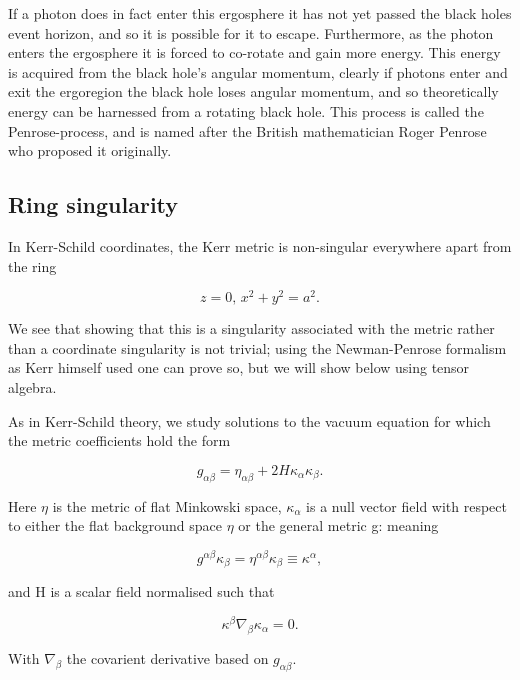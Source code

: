 \documentclass[oneside,openright,frontopenright, singlespacing]{dmathesis}
\begin{document}
\vspace{1em}
	If a photon does in fact enter this ergosphere it has not yet passed the black holes event horizon, and so it is possible for it to escape. Furthermore, as the photon enters the ergosphere it is forced to co-rotate and gain more energy. This energy is acquired from the black hole's angular momentum, clearly if photons enter and exit the ergoregion the black hole loses angular momentum, and so theoretically energy can be harnessed from a rotating black hole. This process is called the Penrose-process\cite{penrose1971extraction}, and is named after the British mathematician Roger Penrose who proposed it originally.

\subsection{Ring singularity}\label{subsec:SubSection4.3.3}

\vspace{1em}
	In Kerr-Schild coordinates, the Kerr metric is non-singular everywhere apart from the ring

	\[z=0\mbox{, } x^2+y^2=a^2.\]

\vspace{1em}
	We see that showing that this is a singularity associated with the metric rather than a coordinate singularity is not trivial; using the Newman-Penrose formalism as Kerr himself used\cite{kerr2008discovering} one can prove so, but we will show below using tensor algebra. 

\vspace{1em}
	As in Kerr-Schild theory, we study solutions to the vacuum equation for which the metric coefficients hold the form

	\[g_{\alpha\beta} = \eta_{\alpha\beta} + 2H\kappa_\alpha\kappa_\beta.\]

\vspace{1em}
	Here $\eta$ is the metric of flat Minkowski space, $\kappa_\alpha$ is a null vector field with respect to either the flat background space $\eta$ or the general metric g: meaning

	\[g^{\alpha\beta}\kappa_\beta=\eta^{\alpha\beta}\kappa_\beta\equiv\kappa^\alpha,\]

\vspace{1em}
	and H is a scalar field normalised such that

	\[\kappa^\beta\nabla_\beta\kappa_\alpha=0.\]

\vspace{1em}
	With $\nabla_\beta$ the covarient derivative based on $g_{\alpha\beta}$.
\end{document}
